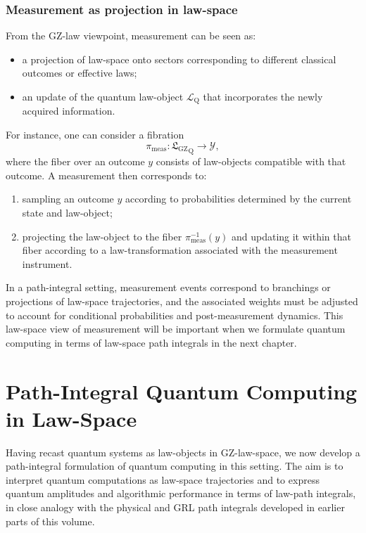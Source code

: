 \documentclass[11pt]{book}
\newcommand{\GZLS}{\ensuremath{\mathfrak{L}_{\mathrm{GZ}}}}
\theoremstyle{plain}
\theoremstyle{definition}
\theoremstyle{remark}
\begin{document}
\subsection*{Measurement as projection in law-space}

From the GZ-law viewpoint, measurement can be seen as:
\begin{itemize}
  \item a projection of law-space onto sectors corresponding to
        different classical outcomes or effective laws;
  \item an update of the quantum law-object $\mathcal{L}_{\mathrm{Q}}$
        that incorporates the newly acquired information.
\end{itemize}

For instance, one can consider a fibration
\[
   \pi_{\mathrm{meas}} \colon {\GZLS}_{\mathrm{Q}} \longrightarrow
   \mathcal{Y},
\]
where the fiber over an outcome $y$ consists of law-objects
compatible with that outcome. A measurement then corresponds to:
\begin{enumerate}
  \item sampling an outcome $y$ according to probabilities determined
        by the current state and law-object;
  \item projecting the law-object to the fiber
        $\pi_{\mathrm{meas}}^{-1}(y)$ and updating it within that
        fiber according to a law-transformation associated with the
        measurement instrument.
\end{enumerate}

In a path-integral setting, measurement events correspond to
branchings or projections of law-space trajectories, and the
associated weights must be adjusted to account for conditional
probabilities and post-measurement dynamics. This law-space view
of measurement will be important when we formulate quantum
computing in terms of law-space path integrals in the next chapter.



\chapter[Path-Integral Quantum Computing in Law-Space]{Path-Integral Quantum Computing in Law-Space}
\label{chap:lawspace-quantum-computing}


Having recast quantum systems as law-objects in GZ-law-space, we now
develop a path-integral formulation of quantum computing in this
setting. The aim is to interpret quantum computations as law-space
trajectories and to express quantum amplitudes and algorithmic
performance in terms of law-path integrals, in close analogy with
the physical and GRL path integrals developed in earlier parts of
this volume.
\end{document}
